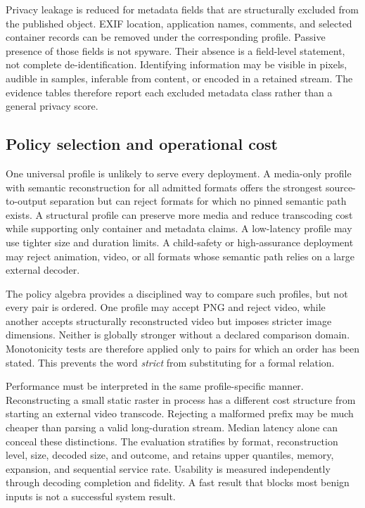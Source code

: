 Privacy leakage is reduced for metadata fields that are structurally excluded
from the published object. EXIF location, application names, comments, and
selected container records can be removed under the corresponding profile.
Passive presence of those fields is not spyware. Their absence is a field-level
statement, not complete de-identification. Identifying information may be
visible in pixels, audible in samples, inferable from content, or encoded in a
retained stream. The evidence tables therefore report each excluded metadata
class rather than a general privacy score.

\subsection{Policy selection and operational cost}

One universal profile is unlikely to serve every deployment. A media-only
profile with semantic reconstruction for all admitted formats offers the
strongest source-to-output separation but can reject formats for which no
pinned semantic path exists. A structural profile can preserve more media and
reduce transcoding cost while supporting only container and metadata claims. A
low-latency profile may use tighter size and duration limits. A child-safety or
high-assurance deployment may reject animation, video, or all formats whose
semantic path relies on a large external decoder.

The policy algebra provides a disciplined way to compare such profiles, but
not every pair is ordered. One profile may accept PNG and reject video, while
another accepts structurally reconstructed video but imposes stricter image
dimensions. Neither is globally stronger without a declared comparison domain.
Monotonicity tests are therefore applied only to pairs for which an order has
been stated. This prevents the word \emph{strict} from substituting for a formal
relation.

Performance must be interpreted in the same profile-specific manner.
Reconstructing a small static raster in process has a different cost structure
from starting an external video transcode. Rejecting a malformed prefix may be
much cheaper than parsing a valid long-duration stream. Median latency alone
can conceal these distinctions. The evaluation stratifies by format,
reconstruction level, size, decoded size, and outcome, and retains upper
quantiles, memory, expansion, and sequential service rate. Usability is
measured independently through decoding completion and fidelity. A fast result
that blocks most benign inputs is not a successful system result.

